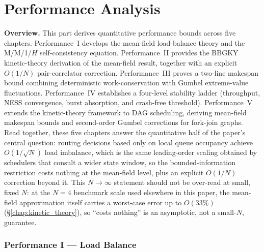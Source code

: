 \documentclass[11pt,a4paper]{article}
\newcommand{\partbreak}{\clearpage\phantomsection}
\begin{document}
\partbreak
\part{Performance Analysis}

\bigskip
\noindent\textbf{Overview.}
This part derives quantitative performance bounds across five chapters.
Performance~I develops the mean-field load-balance theory and the
M/M/1/$H$ self-consistency equation.
Performance~II provides the BBGKY kinetic-theory derivation of the
mean-field result, together with an explicit $O(1/N)$ pair-correlator correction.
Performance~III proves a two-line makespan bound combining deterministic
work-conservation with Gumbel extreme-value fluctuations.
Performance~IV establishes a four-level stability ladder
(throughput, NESS convergence, burst absorption, and crash-free threshold).
Performance~V extends the kinetic-theory framework to
DAG scheduling, deriving mean-field makespan bounds and second-order
Gumbel corrections for fork-join graphs.
Read together, these five chapters answer the quantitative half of the
paper's central question: routing decisions based only on local queue
occupancy achieve $O(1/\sqrt{N})$ load imbalance, which is the same
leading-order scaling obtained by schedulers that consult a wider state
window, so the bounded-information restriction costs nothing at the
mean-field level, plus an explicit $O(1/N)$ correction beyond it. This
$N \to \infty$ statement should not be over-read at small, fixed $N$:
at the $N=4$ benchmark scale used elsewhere in this paper, the
mean-field approximation itself carries a worst-case error up to
$O(33\%)$ (\S\ref{chap:kinetic_theory}), so ``costs nothing'' is an
asymptotic, not a small-$N$, guarantee.



\section*{Performance I --- Load Balance}
\label{chap:load_balance}
\setcounter{section}{0}
\end{document}

